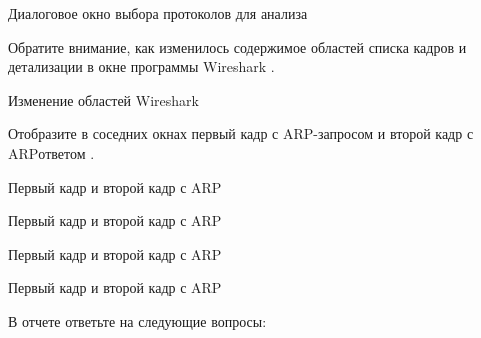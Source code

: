 \begin{image}
	\caption{Диалоговое окно выбора протоколов для анализа}
	\label{fig:wrsh:enabled:protocols}
\end{image}

Обратите внимание, как изменилось содержимое областей списка кадров
и детализации в окне программы Wireshark
.

\begin{image}
	\caption{Изменение областей Wireshark}
	\label{fig:wrsh:enabled:protocols:change}
\end{image}

Отобразите в соседних окнах первый кадр с ARP-запросом
и второй кадр с ARPответом
.

\begin{image}
	\caption{Первый кадр и второй кадр с ARP}
	\label{fig:wrsh:arp:diff}
\end{image}
\begin{image}
	\caption{Первый кадр и второй кадр с ARP}
	\label{fig:wrsh:arp:diff:1}
\end{image}
\begin{image}
	\caption{Первый кадр и второй кадр с ARP}
	\label{fig:wrsh:arp:diff:2}
\end{image}
\begin{image}
	\caption{Первый кадр и второй кадр с ARP}
	\label{fig:wrsh:arp:diff:3}
\end{image}

В отчете ответьте на следующие вопросы:

